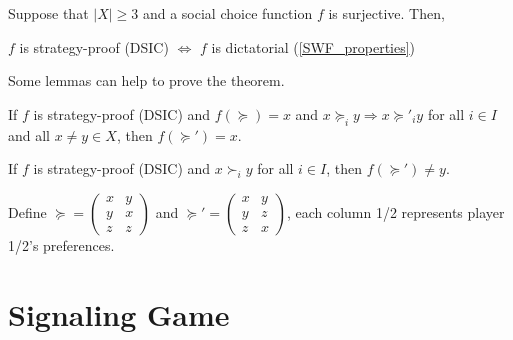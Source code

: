 \documentclass[11pt]{elegantbook}
\begin{document}
\begin{theorem}
    Suppose that $|X|\geq 3$ and a social choice function $f$ is surjective. Then,
    \begin{center}
        $f$ is strategy-proof (DSIC) $\Leftrightarrow$ $f$ is dictatorial (\ref{SWF_properties})
    \end{center}
\end{theorem}
Some lemmas can help to prove the theorem.
\begin{lemma}
    If $f$ is strategy-proof (DSIC) and $f(\succeq)=x$ and $x\succeq_i y \Rightarrow x\succeq'_i y$ for all $i\in I$ and all $x\neq y\in X$, then $f(\succeq')=x$.
\end{lemma}

\begin{lemma}
    If $f$ is strategy-proof (DSIC) and $x\succ_i y$ for all $i\in I$, then $f(\succeq')\neq y$.
\end{lemma}

\begin{example}
    Define $\succeq=\begin{pmatrix}
        x&y\\
        y&x\\
        z&z
    \end{pmatrix}$ and $\succeq'=\begin{pmatrix}
        x&y\\
        y&z\\
        z&x
    \end{pmatrix}$, each column 1/2 represents player 1/2's preferences.
\end{example}






\section{Signaling Game}
\end{document}
